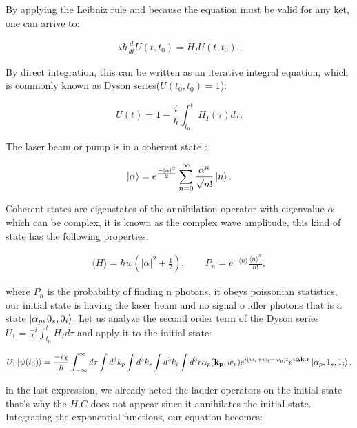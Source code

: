 \documentclass[12pt]{book}
\begin{document}
By applying the Leibniz rule and because the equation must be valid for any ket, one can arrive to:

\begin{align}
i \hbar \frac{d}{dt}U(t,t_{0})=H_{I}U(t,t_{0}).
\end{align}

By direct integration, this can be written as an iterative integral equation, which is commonly known as Dyson series($U(t_{0},t_{0})=1$):

\begin{equation}
U(t)=1-\frac{i}{\hbar} \int_{t_{0}}^{t} H_{I} (\tau) d\tau.
\end{equation}

The laser beam or pump is in a coherent state \cite{leonhardt}:

\begin{equation}
\ket{\alpha}=e^{\frac{-|\alpha|^{2}}{2}} \sum_{n=0}^{\infty} \frac{\alpha^{n}}{\sqrt{n!}} \ket{n}.
\end{equation}

Coherent states are eigenstates of the annihilation operator with eigenvalue $\alpha$ which can be complex, it is known as the complex wave amplitude, this kind of state has the following properties:

\begin{align}
\langle H \rangle = \hbar w (|\alpha|^{2}+\frac{1}{2}),\qquad P_{n}=e^{-\langle n\rangle}\frac{\langle n \rangle^{n}}{n!},
\end{align}

where $P_{n}$ is the probability of finding n photons, it obeys poissonian statistics, our initial state is having the laser beam and no signal o idler photons that is a state $\ket{\alpha_{p},0_{s},0_{i}}$. Let us analyze the second order term of the Dyson series  $U_{1}=\frac{-i}{\hbar}\int_{t_{0}}^{t} H_{I} d\tau$ and apply it to the initial state:

\begin{align}
 U_{1}\ket{\psi(t_{0})}=\frac{-i \chi}{\hbar}  \int_{-\infty}^{\infty} d\tau \int d^{3}k_{p}\int d^{3}k_{s}\int d^{3}k_{i}\int d^{3}r \alpha_{p} (\mathbf{k_{p}},w_{p}) e^{i(w_{s}+w_{i}-w_{p})t}e^{i \Delta\textbf{k}.\textbf{r}}\ket{\alpha_{p},1_{s},1_{i}} ,
\end{align}

in the last expression, we already acted the ladder operators on the initial state that's why the $H.C$ does not appear since it annihilates the initial state. Integrating the exponential functions, our equation becomes:
\end{document}
